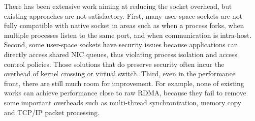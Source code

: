 There has been extensive work aiming at reducing the socket overhead, but existing approaches are not satisfactory.
First, many user-space sockets are not fully compatible with native socket in areas such as when a process forks, when multiple processes listen to the same port, and when communication is intra-host.
Second, some user-space sockets have security issues because applications can directly access shared NIC queues, thus violating process isolation and access control policies.
Those solutions that do preserve security often incur the overhead of kernel crossing or virtual switch.
Third, even in the performance front, there are still much room for improvement. For example, none of existing works can achieve performance close to raw RDMA, because they fail to remove some important overheads such as multi-thread synchronization, memory copy and TCP/IP packet processing.


